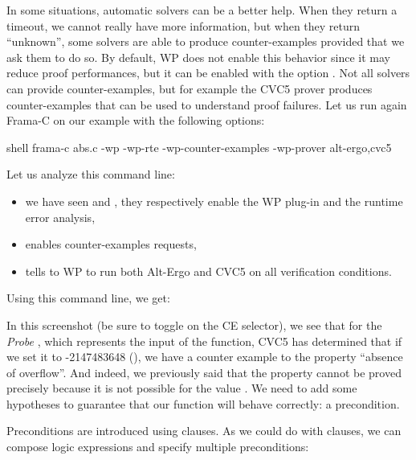 In some situations, automatic solvers can be a better help. When they return a
timeout, we cannot really have more information, but when they return
``unknown'', some solvers are able to produce counter-examples provided that we
ask them to do so.  By default, WP does not enable this behavior since it may
reduce proof performances, but it can be enabled with the option 
. Not all solvers can provide counter-examples,
but for example the CVC5 prover produces counter-examples that can be used to
understand proof failures. Let us run again Frama-C on our example with the
following options:
\begin{CodeBlock}{shell}
frama-c abs.c -wp -wp-rte -wp-counter-examples -wp-prover alt-ergo,cvc5
\end{CodeBlock}


Let us analyze this command line:
\begin{itemize}
  \item we have seen  and , they
        respectively enable the WP plug-in and the runtime error analysis,
  \item {} enables counter-examples requests,
  \item {} tells to WP to run both Alt-Ergo
        and CVC5 on all verification conditions.
\end{itemize}


Using this command line, we get:




In this screenshot (be sure to toggle on the CE selector), we see that for the
\textit{Probe} , which represents the input of the function,
CVC5 has determined that if we set it to -2147483648 (),
we have a counter example to the property ``absence of overflow''. And indeed,
we previously said that the property cannot be proved precisely because it is
not possible for the value . We need to add some hypotheses
to guarantee that our function will behave correctly: a precondition.






Preconditions are introduced using  clauses. As we
could do with  clauses, we can compose logic expressions
and specify multiple preconditions:



